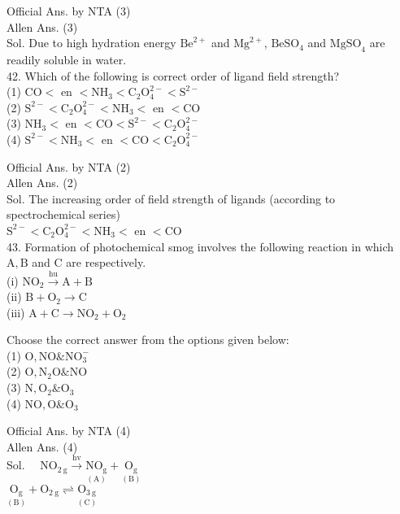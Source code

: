 \documentclass[10pt]{article}
\begin{document}
Official Ans. by NTA (3)\\
Allen Ans. (3)\\
Sol. Due to high hydration energy \(\mathrm{Be}^{2+}\) and \(\mathrm{Mg}^{2+}\), \(\mathrm{BeSO}_{4}\) and \(\mathrm{MgSO}_{4}\) are readily soluble in water.\\
42. Which of the following is correct order of ligand field strength?\\
(1) \(\mathrm{CO}<\) en \(<\mathrm{NH}_{3}<\mathrm{C}_{2} \mathrm{O}_{4}^{2-}<\mathrm{S}^{2-}\)\\
(2) \(\mathrm{S}^{2-}<\mathrm{C}_{2} \mathrm{O}_{4}^{2-}<\mathrm{NH}_{3}<\) en \(<\mathrm{CO}\)\\
(3) \(\mathrm{NH}_{3}<\) en \(<\mathrm{CO}<\mathrm{S}^{2-}<\mathrm{C}_{2} \mathrm{O}_{4}^{2-}\)\\
(4) \(\mathrm{S}^{2-}<\mathrm{NH}_{3}<\) en \(<\mathrm{CO}<\mathrm{C}_{2} \mathrm{O}_{4}^{2-}\)

Official Ans. by NTA (2)\\
Allen Ans. (2)\\
Sol. The increasing order of field strength of ligands (according to spectrochemical series)\\
\(\mathrm{S}^{2-}<\mathrm{C}_{2} \mathrm{O}_{4}^{2-}<\mathrm{NH}_{3}<\) en \(<\mathrm{CO}\)\\
43. Formation of photochemical smog involves the following reaction in which \(\mathrm{A}, \mathrm{B}\) and C are respectively.\\
(i) \(\mathrm{NO}_{2} \xrightarrow{\mathrm{hu}} \mathrm{A}+\mathrm{B}\)\\
(ii) \(\mathrm{B}+\mathrm{O}_{2} \rightarrow \mathrm{C}\)\\
(iii) \(\mathrm{A}+\mathrm{C} \rightarrow \mathrm{NO}_{2}+\mathrm{O}_{2}\)

Choose the correct answer from the options given below:\\
(1) \(\mathrm{O}, \mathrm{NO} \& \mathrm{NO}_{3}^{-}\)\\
(2) \(\mathrm{O}, \mathrm{N}_{2} \mathrm{O} \& \mathrm{NO}\)\\
(3) \(\mathrm{N}, \mathrm{O}_{2} \& \mathrm{O}_{3}\)\\
(4) \(\mathrm{NO}, \mathrm{O} \& \mathrm{O}_{3}\)

Official Ans. by NTA (4)\\
Allen Ans. (4)\\
Sol. \(\quad \mathrm{NO}_{2 \mathrm{~g}} \xrightarrow{\mathrm{hv}} \underset{(\mathrm{A})}{\mathrm{NO}_{\mathrm{g}}}+\underset{(\mathrm{B})}{\mathrm{O}_{\mathrm{g}}}\)\\
\(\underset{(\mathrm{B})}{\mathrm{O}_{\mathrm{g}}}+\mathrm{O}_{2 \mathrm{~g}} \rightleftharpoons \underset{(\mathrm{C})}{\mathrm{O}_{3 \mathrm{~g}}}\)
\end{document}
